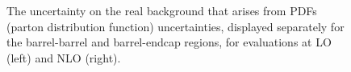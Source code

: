 




\begin{figure}[!htbp]{
\caption{The uncertainty on the real \gmgm background that arises from PDFs (parton distribution function) uncertainties, displayed separately for the barrel-barrel and barrel-endcap regions, for evaluations at LO (left) and NLO (right).} 
\label{Fig:sys_pdf} }
\end{figure}

